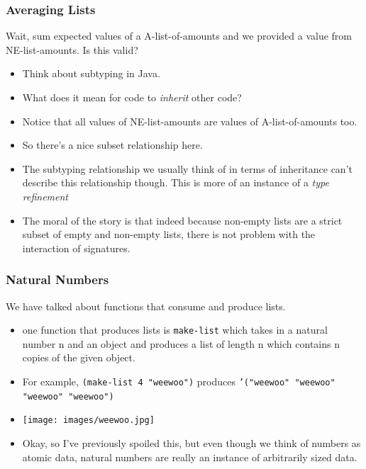 \documentclass{beamer}
\begin{document}
\begin{frame}
  \frametitle{Averaging Lists}
  Wait, sum expected values of a A-list-of-amounts
  and we provided a value from NE-list-amounts. Is this valid?
  \begin{itemize}
  \item<2-> Think about subtyping in Java.
  \item<3-> What does it mean for code to \emph{inherit} other code?
  \item<4-> Notice that all values of NE-list-amounts are values
    of A-list-of-amounts too.
  \item<5-> So there's a nice subset relationship here.
  \item<6-> The subtyping relationship we usually think of
    in terms of inheritance can't describe this relationship though.
    This is more of an instance of a \emph{type refinement}
  \item<7-> The moral of the story is that indeed because non-empty
    lists are a strict subset of empty and non-empty lists, there
    is not problem with the interaction of signatures.
  \end{itemize}
\end{frame}

\begin{frame}
  \frametitle{Natural Numbers}
  We have talked about functions that consume and produce lists.
  \begin{itemize}
  \item<2-> one function that produces lists is \texttt{make-list} which takes in a natural number n and an object and produces a list of length n which contains n copies of the given object.
  \item<3-> For example, \texttt{(make-list 4 "weewoo")} produces  \texttt{'("weewoo" "weewoo" "weewoo" "weewoo")}
  \item<4-> \texttt{[image: images/weewoo.jpg]}
  \item<5-> Okay, so I've previously spoiled this, but even though we
    think of numbers as atomic data, natural numbers are really an
    instance of arbitrarily sized data.
  \end{itemize}
\end{frame}

\begin{verbatim}

\end{verbatim}

\end{document}
